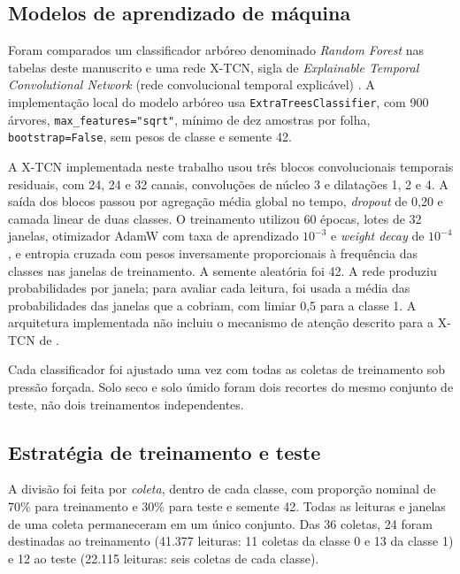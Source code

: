 \subsection{Modelos de aprendizado de máquina}
\label{subsec:modelos}

Foram comparados um classificador arbóreo denominado \emph{Random Forest}
nas tabelas deste manuscrito e uma rede X-TCN, sigla de \emph{Explainable
Temporal Convolutional Network} (rede convolucional temporal explicável)
\cite{chen2026xtcn}. A implementação local do modelo arbóreo usa
\texttt{ExtraTreesClassifier}, com 900 árvores,
\texttt{max\_features="sqrt"}, mínimo de dez amostras por folha,
\texttt{bootstrap=False}, sem pesos de classe e semente 42.


A X-TCN implementada neste trabalho usou três blocos convolucionais
temporais residuais, com 24, 24 e 32 canais, convoluções de núcleo 3 e
dilatações 1, 2 e 4. A saída dos blocos passou por agregação média global
no tempo, \emph{dropout} de 0,20 e camada linear de duas classes. O
treinamento utilizou 60 épocas, lotes de 32 janelas, otimizador AdamW com
taxa de aprendizado $10^{-3}$ e \emph{weight decay} de $10^{-4}$, e
entropia cruzada com pesos inversamente proporcionais à frequência das
classes nas janelas de treinamento. A semente aleatória foi 42. A rede
produziu probabilidades por janela; para avaliar cada leitura, foi usada
a média das probabilidades das janelas que a cobriam, com limiar 0,5 para
a classe 1. A arquitetura implementada não incluiu o mecanismo de atenção
descrito para a X-TCN de \cite{chen2026xtcn}.

Cada classificador foi ajustado uma vez com todas as coletas de treinamento
sob pressão forçada. Solo seco e solo úmido foram dois recortes do mesmo
conjunto de teste, não dois treinamentos independentes.

\subsection{Estratégia de treinamento e teste}
\label{subsec:treinamento_teste}

A divisão foi feita por \emph{coleta}, dentro de cada classe, com
proporção nominal de 70\% para treinamento e 30\% para teste e semente 42.
Todas as leituras e janelas de uma coleta permaneceram em um único conjunto.
Das 36 coletas, 24 foram destinadas ao treinamento (41.377 leituras: 11
coletas da classe 0 e 13 da classe 1) e 12 ao teste (22.115 leituras:
seis coletas de cada classe).


